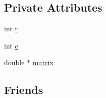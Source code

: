 \subsection*{\-Private \-Attributes}
\begin{DoxyCompactItemize}
\item 
int \hyperlink{classchittmatrix_1_1Matrix_a3dba1697809db31f6341dd80abf8545d}{r}
\item 
int \hyperlink{classchittmatrix_1_1Matrix_aab6aec1cade4ba4006674bbb57eaad7c}{c}
\item 
double $\ast$ \hyperlink{classchittmatrix_1_1Matrix_ae59d87ec4c53e05bae49f1770151ac8f}{matrix}
\end{DoxyCompactItemize}
\subsection*{\-Friends}
